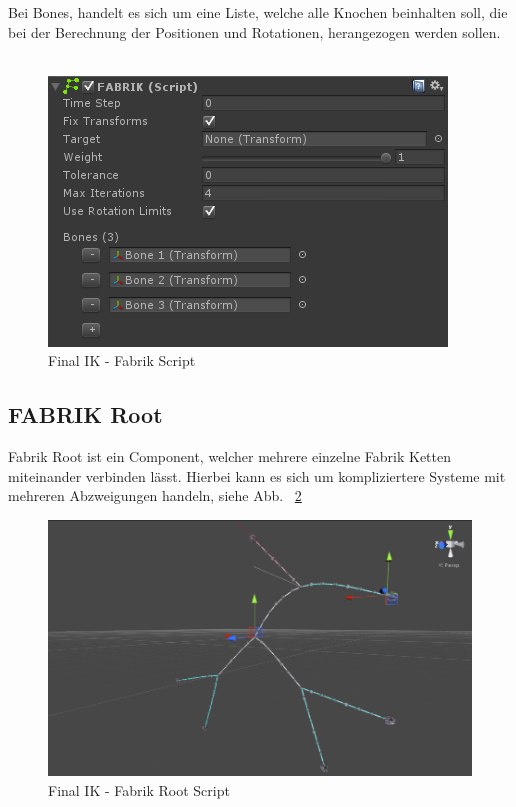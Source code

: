 Bei Bones, handelt es sich um eine Liste, welche alle Knochen beinhalten soll, die bei der Berechnung der
Positionen und Rotationen, herangezogen werden sollen.
~\cite{FinalIK_FABRIK_2021}
\begin {figure}
    \centering
    \includegraphics[scale=0.8]{pics/finalik_fabrik_script}
    \caption{Final IK - Fabrik Script}
    \label{fig:finalIK_fabrik_script}
\end {figure}


\subsection{FABRIK Root}\label{subsec:fabrik-root}


Fabrik Root ist ein Component, welcher mehrere einzelne Fabrik Ketten miteinander verbinden lässt.
Hierbei kann es sich um kompliziertere Systeme mit mehreren Abzweigungen handeln, siehe Abb. ~\ref{fig:finalIK_fabrik_root_example}

\begin {figure}
    \centering
    \includegraphics[scale=0.8]{pics/finalik_fabrik_root_example}
    \caption{Final IK - Fabrik Root Script}
    \label{fig:finalIK_fabrik_root_example}
\end {figure}


